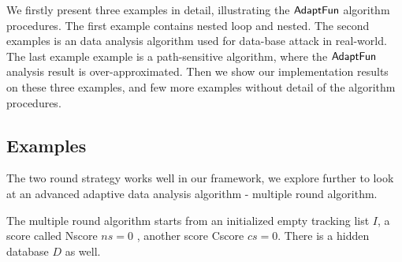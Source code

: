 %
We firstly present three examples in detail, illustrating the $\textsf{AdaptFun}$ algorithm procedures.
The first example contains nested loop and nested.
The second examples is an data analysis algorithm used for data-base attack in real-world.
The last example example is a path-sensitive algorithm, where the $\textsf{AdaptFun}$ analysis result is over-approximated. 
Then we show our implementation results on these three examples, and few more examples without detail of the  algorithm procedures.
%
\subsection{Examples}
%
\begin{example}
%
The two round strategy works well in our framework, we explore further to look at an advanced adaptive data analysis algorithm - multiple round algorithm.
%
%
\end{example}
%
The multiple round algorithm starts from an initialized empty tracking list $I$, a score called Nscore $ns=0$ , another score Cscore $cs=0$.
There is a hidden database $D$ as well.
